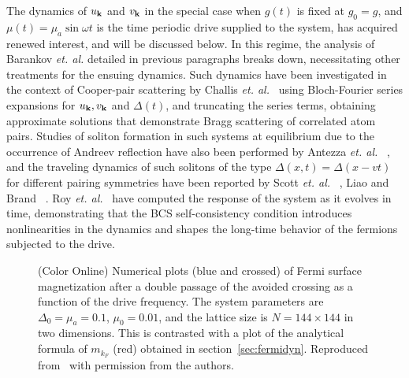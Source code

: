 \documentclass[aps,pra,floats,epsfig,pdflatex]{revtex4}                                                              %
\begin{document}
The dynamics of $u_{\bf k}$ and $v_{\bf k}$ in the special case when $g(t)$ is fixed at $g_0=g$, and  $\mu(t)=\mu_a\sin{\omega t}$ is the time periodic drive supplied to the system, has acquired renewed interest, and will be discussed below.  {In this regime, the analysis of Barankov \textit{et. al.} detailed in previous paragraphs breaks down, necessitating other treatments for the ensuing dynamics. Such dynamics have been investigated in the context of Cooper-pair scattering by Challis \textit{et. al.}}~\cite{challis}  {using Bloch-Fourier series expansions for $u_{\bf k}, v_{\bf k}$ and $\Delta(t)$, and truncating the series terms, obtaining approximate solutions that demonstrate Bragg scattering of correlated atom pairs. Studies of soliton formation in such systems at equilibrium due to the occurrence of Andreev reflection  have also been performed by Antezza \textit{et. al.}}~\cite{antezza} {, and the traveling dynamics of such solitons of the type $\Delta(x,t)=\Delta(x-vt)$ for different pairing 
symmetries have been 
reported by Scott \textit{et. al.}}~\cite{scott} {, Liao and Brand}~\cite{liao} {. 
Roy \textit{et. al.}}~\cite{ourpaper}  {have computed the response of the system as it evolves in time, demonstrating  that the BCS self-consistency condition introduces nonlinearities in the dynamics and shapes the long-time behavior of the fermions subjected to the drive.}
\begin{figure}
\caption{(Color Online) Numerical plots (blue and crossed) of Fermi surface magnetization after a double passage of the avoided crossing as a function of the drive frequency. The system parameters are $\Delta_0=\mu_a=0.1$, $\mu_0=0.01$, and the lattice size is $N=144\times 144$ in two dimensions. This is contrasted with a plot of the analytical formula of $m_{k_F}$ (red) obtained in section~\ref{sec:fermidyn}. Reproduced from~\cite{ourpaper} with permission from the authors.}
\label{fig:magcomp}
\end{figure}
\end{document}
